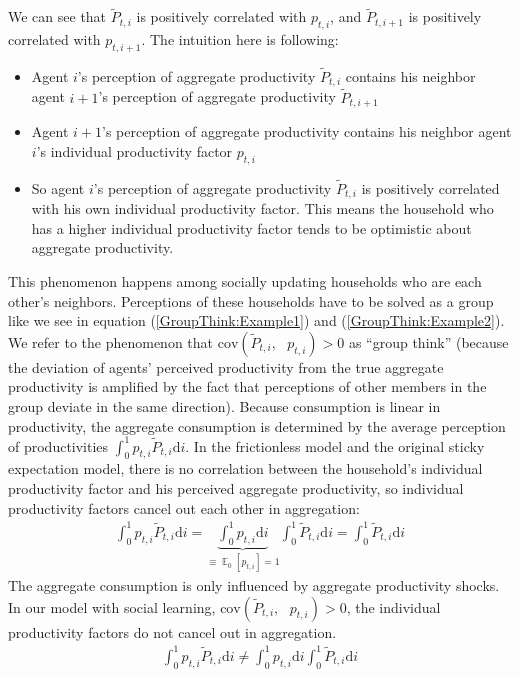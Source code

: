 \documentclass[12pt,letterpaper]{article}
\DeclareMathOperator{\E}{\mathbb{E}}
\begin{document}
We can see that $\tilde{P}_{t,i}$ is positively correlated with $p_{t,i}$, and $\tilde{P}_{t,i+1}$ is positively correlated with $p_{t,i+1}$. The intuition here is following:
\begin{itemize}
	\item Agent $i$'s perception of aggregate productivity $\tilde{P}_{t,i}$ contains his neighbor agent $i+1$'s perception of aggregate productivity $\tilde{P}_{t,i+1}$
	\item Agent $i+1$'s perception of aggregate productivity contains his neighbor agent $i$'s individual productivity factor $p_{t,i}$
	\item So agent $i$'s perception of aggregate productivity $\tilde{P}_{t,i}$ is positively correlated with his own individual productivity factor. This means the household who has a higher individual productivity factor tends to be optimistic about aggregate productivity. 
\end{itemize}
This phenomenon happens among socially updating households who are each other's neighbors. Perceptions of these households have to be solved as a group like we see in equation (\ref{GroupThink:Example1}) and (\ref{GroupThink:Example2}). We refer to the phenomenon that $\text{cov}\left(\tilde{P}_{t,i},\text{ }p_{t,i}\right)>0$ as ``group think'' (because the deviation of agents' perceived productivity from the true aggregate productivity is amplified by the fact that perceptions of other members in the group deviate in the same direction). Because consumption is linear in productivity, the aggregate consumption is determined by the average perception of productivities $\int_{0}^{1}p_{t,i}\tilde{P}_{t,i}\text{d}i$. In the frictionless model and the original sticky expectation model, there is no correlation between the household's individual productivity factor and his perceived aggregate productivity, so individual productivity factors cancel out each other in aggregation:
\begin{eqnarray}
\int_{0}^{1}p_{t,i}\tilde{P}_{t,i}\text{d}i=\underbrace{\int_{0}^{1}p_{t,i}\text{d}i}_{\equiv\E_{0}[p_{t,i}]=1}\int_{0}^{1}\tilde{P}_{t,i}\text{d}i=\int_{0}^{1}\tilde{P}_{t,i}\text{d}i
\end{eqnarray}
The aggregate consumption is only influenced by aggregate productivity shocks. In our model with social learning, $\text{cov}\left(\tilde{P}_{t,i},\text{ }p_{t,i}\right)>0$, the individual productivity factors do not cancel out in aggregation.
\begin{eqnarray}
\int_{0}^{1}p_{t,i}\tilde{P}_{t,i}\text{d}i\neq\int_{0}^{1}p_{t,i}\text{d}i\int_{0}^{1}\tilde{P}_{t,i}\text{d}i
\end{eqnarray}
\end{document}
